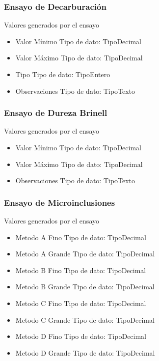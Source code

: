 \documentclass{article}
\begin{document}
\subsubsection{Ensayo de Decarburación  }

\par Valores generados por el ensayo
\begin{itemize}
	\item{Valor Mínimo} 
		\subitem Tipo de dato: \gls{TipoDecimal}
	\item{Valor Máximo} 
		\subitem Tipo de dato: \gls{TipoDecimal}
	\item{Tipo} 
		\subitem Tipo de dato: \gls{TipoEntero}
	\item{Observaciones}
		\subitem Tipo de dato: \gls{TipoTexto}
\end{itemize}
\subsubsection{Ensayo de Dureza Brinell }

\par Valores generados por el ensayo
\begin{itemize}
	\item{Valor Mínimo} 
		\subitem Tipo de dato: \gls{TipoDecimal}
	\item{Valor Máximo} 
		\subitem Tipo de dato: \gls{TipoDecimal}
	\item{Observaciones}
		\subitem Tipo de dato: \gls{TipoTexto}
\end{itemize}
\subsubsection{Ensayo de  Microinclusiones}
\par Valores generados por el ensayo
\begin{itemize}
	\item{Metodo A Fino}
		\subitem Tipo de dato: \gls{TipoDecimal}
	\item{Metodo A Grande}
		\subitem Tipo de dato: \gls{TipoDecimal}
	\item{Metodo B Fino}
		\subitem Tipo de dato: \gls{TipoDecimal}
	\item{Metodo B Grande}
		\subitem Tipo de dato: \gls{TipoDecimal}
	\item{Metodo C Fino}
		\subitem Tipo de dato: \gls{TipoDecimal}
	\item{Metodo C Grande}
		\subitem Tipo de dato: \gls{TipoDecimal}
	\item{Metodo D Fino}
		\subitem Tipo de dato: \gls{TipoDecimal}
	\item{Metodo D Grande}
		\subitem Tipo de dato: \gls{TipoDecimal}
\end{itemize}
\end{document}
